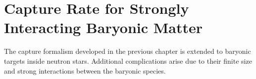 \graphicspath{{img/chapter_4/}}

\chapter{Capture Rate for Strongly Interacting Baryonic Matter}
\label{chapter:capture_2}

\begin{synopsis}
   The capture formalism developed in the previous chapter is extended to baryonic targets inside neutron stars. Additional complications arise due to their finite size and strong interactions between the baryonic species.  
\end{synopsis}
